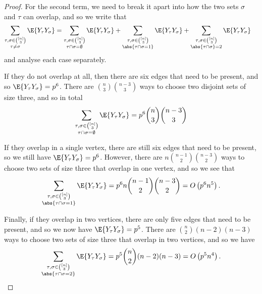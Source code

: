 \documentclass[nobib]{tufte-handout}
\begin{document}
\begin{proposition}
\begin{proof}
    For the second term, we need to break it apart into how the two sets $\sigma$ and $\tau$ can overlap, and so we write that
    \begin{align*}
      \sum_{\substack{\tau, \sigma \in \binom{[n]}{3}\\\tau \neq \sigma}} \E{Y_\tau Y_\sigma} &= \sum_{\substack{\tau, \sigma \in \binom{[n]}{3}\\\tau \cap \sigma = \emptyset}} \E{Y_\tau Y_\sigma} + \sum_{\substack{\tau, \sigma \in \binom{[n]}{3}\\\abs{\tau \cap \sigma = 1}}} \E{Y_\tau Y_\sigma} + \sum_{\substack{\tau, \sigma \in \binom{[n]}{3}\\\abs{\tau \cap \sigma} = 2}} \E{Y_\tau Y_\sigma}
    \end{align*}
    and analyse each case separately.

    If they do not overlap at all, then there are six edges that need to be present, and so $\E{Y_\tau Y_\sigma} = p^6$. There are $\binom{n}{3}\binom{n-3}{3}$ ways to choose two disjoint sets of size three, and so in total
    $$\sum_{\substack{\tau, \sigma \in \binom{[n]}{3}\\\tau \cap \sigma = \emptyset}} \E{Y_\tau Y_\sigma} = p^6\binom{n}{3}\binom{n-3}{3}$$%

    If they overlap in a single vertex, there are still six edges that need to be present, so we still have $\E{Y_\tau Y_\sigma} = p^6$. However, there are $n\binom{n-1}{2}\binom{n-3}{2}$ ways to choose two sets of size three that overlap in one vertex, and so we see that
    $$\sum_{\substack{\tau, \sigma \in \binom{[n]}{3}\\\abs{\tau \cap \sigma = 1}}} \E{Y_\tau Y_\sigma} = p^6 n\binom{n-1}{2}\binom{n-3}{2} = O\left(p^6 n^5\right).$$

    Finally, if they overlap in two vertices, there are only five edges that need to be present, and so we now have $\E{Y_\tau Y_\sigma} = p^5$. There are $\binom{n}{2}(n-2)(n-3)$ ways to choose two sets of size three that overlap in two vertices, and so we have
    $$\sum_{\substack{\tau, \sigma \in \binom{[n]}{3}\\\abs{\tau \cap \sigma = 2}}} \E{Y_\tau Y_\sigma} = p^5 \binom{n}{2}(n-2)(n-3) = O\left(p^5 n^4\right).$$


\end{proof}
\end{proposition}
\end{document}
